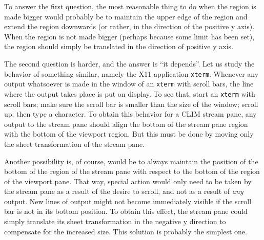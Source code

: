 \documentclass{article}
\begin{document}
To answer the first question, the most reasonable thing to do when the
region is made bigger would probably be to maintain the upper edge of
the region and extend the region downwards (or rather, in the
direction of the positive y axis).  When the region is not made bigger
(perhaps because some limit has been set), the region should simply
be translated in the direction of positive y axis. 

The second question is harder, and the answer is ``it depends''.  Let
us study the behavior of something similar, namely the X11 application
\texttt{xterm}.  Whenever any output whatsoever is made in the window
of an \texttt{xterm} with scroll bars, the line where the output takes
place is put on display.  To see that, start an \texttt{xterm} with
scroll bars; make sure the scroll bar is smaller than the size of the
window; scroll up; then type a character.  To obtain this behavior for
a CLIM stream pane, any output to the stream pane should align the
bottom of the stream pane region with the bottom of the viewport
region.  But this must be done by moving only the sheet transformation
of the stream pane.  

Another possibility is, of course, would be to always maintain the
position of the bottom of the region of the stream pane with respect
to the bottom of the region of the viewport pane.  That way, special
action would only need to be taken by the stream pane as a result of
the desire to scroll, and not as a result of \emph{any} output.  New
lines of output might not become immediately visible if the scroll bar
is not in its bottom position.  To obtain this effect, the stream pane
could simply translate its sheet transformation in the negative y
direction to compensate for the increased size.  This solution is
probably the simplest one. 
\end{document}
